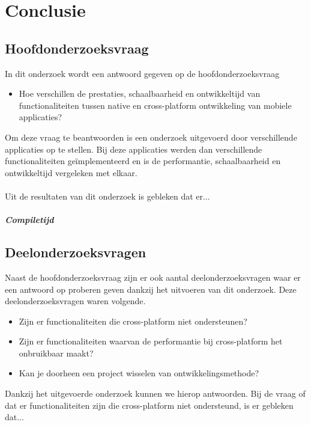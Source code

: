 
\chapter{Conclusie}%
\label{ch:conclusie}


\section{Hoofdonderzoeksvraag}
In dit onderzoek wordt een antwoord gegeven op de hoofdonderzoeksvraag 
\begin{itemize}
    \item Hoe verschillen de prestaties, schaalbaarheid en ontwikkeltijd van functionaliteiten tussen native en cross-platform ontwikkeling van mobiele applicaties?
\end{itemize}
Om deze vraag te beantwoorden is een onderzoek uitgevoerd door verschillende applicaties op te stellen. 
Bij deze applicaties werden dan verschillende functionaliteiten geïmplementeerd en is de performantie, 
schaalbaarheid en ontwikkeltijd vergeleken met elkaar. 
\\\\
Uit de resultaten van dit onderzoek is gebleken dat er...

\paragraph{Compiletijd}


\section{Deelonderzoeksvragen}
Naast de hoofdonderzoeksvraag zijn er ook aantal deelonderzoeksvragen waar er een antwoord op proberen 
geven dankzij het uitvoeren van dit onderzoek. 
Deze deelonderzoeksvragen waren volgende.
\begin{itemize}
    \item Zijn er functionaliteiten die cross-platform niet ondersteunen?
    \item Zijn er functionaliteiten waarvan de performantie bij cross-platform het onbruikbaar maakt?
    \item Kan je doorheen een project wisselen van ontwikkelingsmethode?
\end{itemize}
Dankzij het uitgevoerde onderzoek kunnen we hierop antwoorden. Bij de vraag of dat er 
functionaliteiten zijn die cross-platform niet ondersteund, 
is er gebleken dat...

